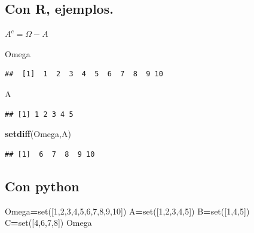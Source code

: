 \documentclass[]{book}
\newenvironment{Shaded}{\begin{snugshade}}{\end{snugshade}}
\newcommand{\BuiltInTok}[1]{#1}
\newcommand{\DecValTok}[1]{\textcolor[rgb]{0.00,0.00,0.81}{#1}}
\newcommand{\KeywordTok}[1]{\textcolor[rgb]{0.13,0.29,0.53}{\textbf{#1}}}
\newcommand{\NormalTok}[1]{#1}
\newcommand{\OperatorTok}[1]{\textcolor[rgb]{0.81,0.36,0.00}{\textbf{#1}}}
\begin{document}
\hypertarget{con-r-ejemplos.-5}{%
\subsection{Con R, ejemplos.}\label{con-r-ejemplos.-5}}

\(A^c=\Omega-A\)

\begin{Shaded}
\begin{Highlighting}[]
\NormalTok{Omega}
\end{Highlighting}
\end{Shaded}

\begin{verbatim}
##  [1]  1  2  3  4  5  6  7  8  9 10
\end{verbatim}

\begin{Shaded}
\begin{Highlighting}[]
\NormalTok{A}
\end{Highlighting}
\end{Shaded}

\begin{verbatim}
## [1] 1 2 3 4 5
\end{verbatim}

\begin{Shaded}
\begin{Highlighting}[]
\KeywordTok{setdiff}\NormalTok{(Omega,A)}
\end{Highlighting}
\end{Shaded}

\begin{verbatim}
## [1]  6  7  8  9 10
\end{verbatim}

\hypertarget{con-python}{%
\subsection{Con python}\label{con-python}}

\begin{Shaded}
\begin{Highlighting}[]
\NormalTok{Omega}\OperatorTok{=}\BuiltInTok{set}\NormalTok{([}\DecValTok{1}\NormalTok{,}\DecValTok{2}\NormalTok{,}\DecValTok{3}\NormalTok{,}\DecValTok{4}\NormalTok{,}\DecValTok{5}\NormalTok{,}\DecValTok{6}\NormalTok{,}\DecValTok{7}\NormalTok{,}\DecValTok{8}\NormalTok{,}\DecValTok{9}\NormalTok{,}\DecValTok{10}\NormalTok{])}
\NormalTok{A}\OperatorTok{=}\BuiltInTok{set}\NormalTok{([}\DecValTok{1}\NormalTok{,}\DecValTok{2}\NormalTok{,}\DecValTok{3}\NormalTok{,}\DecValTok{4}\NormalTok{,}\DecValTok{5}\NormalTok{])}
\NormalTok{B}\OperatorTok{=}\BuiltInTok{set}\NormalTok{([}\DecValTok{1}\NormalTok{,}\DecValTok{4}\NormalTok{,}\DecValTok{5}\NormalTok{])}
\NormalTok{C}\OperatorTok{=}\BuiltInTok{set}\NormalTok{([}\DecValTok{4}\NormalTok{,}\DecValTok{6}\NormalTok{,}\DecValTok{7}\NormalTok{,}\DecValTok{8}\NormalTok{])}
\NormalTok{Omega}
\end{Highlighting}
\end{Shaded}
\end{document}
